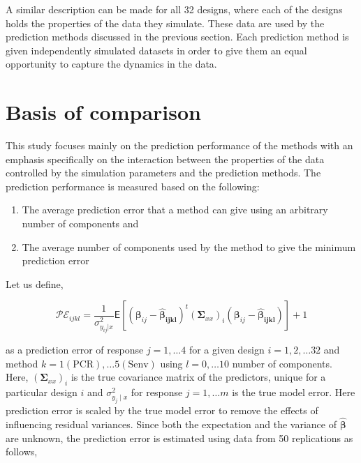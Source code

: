 \documentclass[review]{elsarticle}
\providecommand{\tightlist}{%
  \setlength{\itemsep}{0pt}\setlength{\parskip}{0pt}}
\begin{document}
A similar description can be made for all 32 designs, where each of the
designs holds the properties of the data they simulate. These data are
used by the prediction methods discussed in the previous section. Each
prediction method is given independently simulated datasets in order to
give them an equal opportunity to capture the dynamics in the data.

\section{Basis of comparison}\label{basis-of-comparison}

This study focuses mainly on the prediction performance of the methods
with an emphasis specifically on the interaction between the properties
of the data controlled by the simulation parameters and the prediction
methods. The prediction performance is measured based on the following:

\begin{enumerate}
\def\labelenumi{\alph{enumi})}
\tightlist
\item
  The average prediction error that a method can give using an arbitrary
  number of components and
\item
  The average number of components used by the method to give the
  minimum prediction error
\end{enumerate}

Let us define,

\begin{equation}
\mathcal{PE}_{ijkl} = \frac{1}{\sigma_{y_{ij}|x}^2}
  \mathsf{E}{\left[\left(\boldsymbol{\beta}_{ij} -
  \boldsymbol{\hat{\beta}_{ijkl}}\right)^t
  \left(\boldsymbol{\Sigma}_{xx}\right)_i
  \left(\boldsymbol{\beta}_{ij} - \boldsymbol{\hat{\beta}_{ijkl}}\right)\right]} + 1
\label{eq:pred-error}
\end{equation}

as a prediction error of response \(j = 1, \ldots 4\) for a given design
\(i=1, 2, \ldots 32\) and method
\(k=1(\text{PCR}), \ldots 5(\text{Senv})\) using \(l=0, \ldots 10\)
number of components. Here, \(\left(\boldsymbol{\Sigma}_{xx}\right)_i\)
is the true covariance matrix of the predictors, unique for a particular
design \(i\) and \(\sigma_{y_j\mid x}^2\) for response
\(j = 1, \ldots m\) is the true model error. Here prediction error is
scaled by the true model error to remove the effects of influencing
residual variances. Since both the expectation and the variance of
\(\hat{\boldsymbol{\beta}}\) are unknown, the prediction error is
estimated using data from 50 replications as follows,
\end{document}
